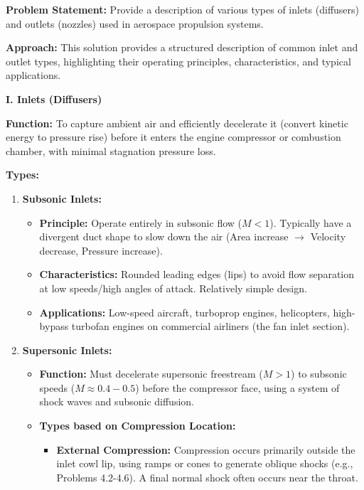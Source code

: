 \textbf{Problem Statement:} Provide a description of various types of
inlets (diffusers) and outlets (nozzles) used in aerospace propulsion
systems.

\textbf{Approach:} This solution provides a structured description of
common inlet and outlet types, highlighting their operating principles,
characteristics, and typical applications.

\textbf{I. Inlets (Diffusers)}

\textbf{Function:} To capture ambient air and efficiently decelerate it
(convert kinetic energy to pressure rise) before it enters the engine
compressor or combustion chamber, with minimal stagnation pressure loss.

\textbf{Types:}

\begin{enumerate}
\def\labelenumi{\arabic{enumi}.}
\tightlist
\item
  \textbf{Subsonic Inlets:}

  \begin{itemize}
  \tightlist
  \item
    \textbf{Principle:} Operate entirely in subsonic flow (\(M < 1\)).
    Typically have a divergent duct shape to slow down the air (Area
    increase \(\to\) Velocity decrease, Pressure increase).
  \item
    \textbf{Characteristics:} Rounded leading edges (lips) to avoid flow
    separation at low speeds/high angles of attack. Relatively simple
    design.
  \item
    \textbf{Applications:} Low-speed aircraft, turboprop engines,
    helicopters, high-bypass turbofan engines on commercial airliners
    (the fan inlet section).
  \end{itemize}
\item
  \textbf{Supersonic Inlets:}

  \begin{itemize}
  \tightlist
  \item
    \textbf{Function:} Must decelerate supersonic freestream (\(M > 1\))
    to subsonic speeds (\(M \approx 0.4-0.5\)) before the compressor
    face, using a system of shock waves and subsonic diffusion.
  \item
    \textbf{Types based on Compression Location:}

    \begin{itemize}
    \tightlist
    \item
      \textbf{External Compression:} Compression occurs primarily
      outside the inlet cowl lip, using ramps or cones to generate
      oblique shocks (e.g., Problems 4.2-4.6). A final normal shock
      often occurs near the throat.


\end{itemize}
\end{itemize}
\end{enumerate}
